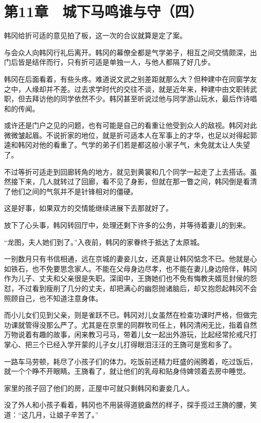 \section{第11章　城下马鸣谁与守（四）}

韩冈给折可适的意见拍了板，这一次的合议就算是定了案。

与会众人向韩冈行礼后离开。韩冈的幕僚全都是气学弟子，相互之间交情颇深，出门后皆是结伴而行，只有折可适是单独一人，与他人都隔了好几步。

韩冈在后面看着，有些头疼。难道说文武之别差距就那么大？但种建中在同窗学友之中，人缘却并不差。过去求学时代的交往不谈，就是近年来，种建中由文职转武职，但去拜访他的同学依然不少。韩冈甚至听说过他与同学游山玩水，最后作诗唱和的传闻。

或许还是门户之见的问题，也有可能是自己的看重让他受到众人的敌视。韩冈对此微微皱起眉。不说折家的地位，就是折可适本人在军事上的才华，也足以对得起郭逵和韩冈对他的看重了。气学的弟子们若是都这般小家子气，未免就太让人失望了。

不过等折可适走到回廊转角的地方，就见到黄裳和几个同学一起走了上去搭话。虽然接下来，几人就转过了回廊，看不见了身影，但就在那一瞥之间，韩冈倒是看清了他们之间的气氛并不是针锋相对的僵硬。

这是好事，如果双方的交情能继续进展下去那就好了。

放下了心头事，韩冈转回厅中，处理还剩下许多的公务，并等待着妻儿的到来。

“龙图，夫人她们到了。”入夜前，韩冈的家眷终于抵达了太原城。

一别数月只有书信相通，远在京城的妻妾儿女，还真是让韩冈惦念不已。他就是心如铁石，也不免要思念家人。不能在父母身边尽孝，也不能在妻儿身边陪伴，韩冈作为儿子、丈夫和父亲很是失职。深闺中，王旖她们也不免有悔教夫婿觅封侯的怨怼，不过看到瘦削了几分的丈夫，却把满心的幽怨抛诸脑后，却又抱怨起韩冈不会照顾自己，也不知道注意身体。

而小儿女们见到父亲，则是雀跃不已。韩冈对儿女虽然在检查功课时严格，但做完功课就管得没那么严了。尤其是在京里的同群牧司任上，韩冈清闲无比，指着自然万物说着有趣的故事，闲来教习弓马，带着儿女一起出外游玩，比起经常抡戒尺打掌心、把三个已经入学开蒙的儿子女儿打得眼泪汪汪的王旖可是宽和多了。

一路车马劳顿，耗尽了小孩子们的体力。吃饭前还精力旺盛的闹腾着，吃过饭后，就一个个睁不开眼睛。王旖看了，就让他们的乳母和贴身侍婢领着去房中睡觉。

家里的孩子回了他们的房，正屋中可就只剩韩冈和妻妾几人。

没了外人和小孩子看着，韩冈也不用装得道貌盎然的样子，探手揽过王旖的腰，笑道：“这几月，让娘子辛苦了。”

